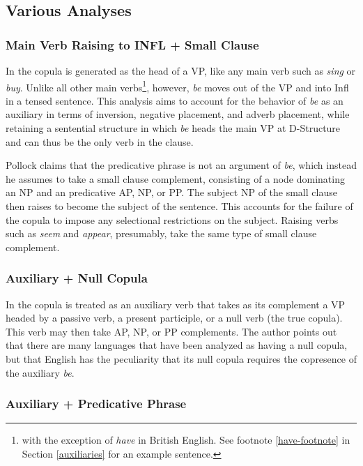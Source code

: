 \subsection{Various Analyses}
\label{sm-clause-other-analyses}

\subsubsection{Main Verb Raising to INFL + Small Clause}

In \cite{pollack89} the copula is generated as the head of a VP, like any main
verb such as {\it sing} or {\it buy}. Unlike all other main verbs\footnote{with
the exception of {\it have} in British English. See footnote
\ref{have-footnote} in Section \ref{auxiliaries} for an example sentence.},
however, {\it be} moves out of the VP and into Infl in a tensed sentence.  This
analysis aims to account for the behavior of {\it be} as an auxiliary in terms
of inversion, negative placement, and adverb placement, while retaining a
sentential structure in which {\it be} heads the main VP at D-Structure and can
thus be the only verb in the clause.

Pollock claims that the predicative phrase is not an argument of {\it be},
which instead he assumes to take a small clause complement, consisting of a
node dominating an NP and an predicative AP, NP, or PP. The subject NP of the
small clause then raises to become the subject of the sentence.  This accounts
for the failure of the copula to impose any selectional restrictions on the
subject.  Raising verbs such as {\it seem} and {\it appear}, presumably, take the
same type of small clause complement.

\subsubsection{Auxiliary + Null Copula}
\label{la}

In \cite{lapointe80} the copula is treated as an auxiliary verb that takes as its
complement a VP headed by a passive verb, a present participle, or a null verb
(the true copula). This verb may then take AP, NP, or PP complements.  The
author points out that there are many languages that have been analyzed as
having a null copula, but that English has the peculiarity that its
null copula requires the copresence of the auxiliary {\it be}.

\subsubsection{Auxiliary + Predicative Phrase}
\label{gpsg}

